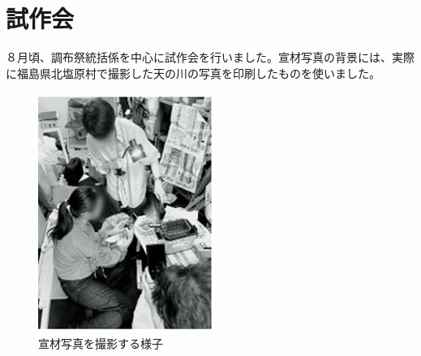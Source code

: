 \documentclass[../super_nova_20yy]{subfiles}
\begin{document}
\section{試作会}
８月頃、調布祭統括係を中心に試作会を行いました。宣材写真の背景には、実際に福島県北塩原村で撮影した天の川の写真を印刷したものを使いました。
\begin{figure}[H]
  \centering
  \begin{minipage}[t]{0.4\columnwidth}
    \centering
    \includegraphics[width=\columnwidth]{画像2.jpg}
    \caption{宣材写真を撮影する様子}
    \label{fig:2}
  \end{minipage}
  \begin{minipage}[t]{0.4\columnwidth}
    \centering

\end{minipage}
\end{figure}
\end{document}
